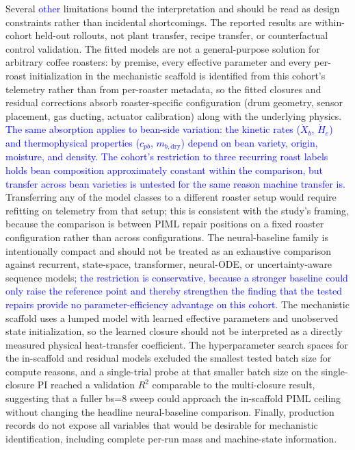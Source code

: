 \documentclass[fleqn,10pt]{wlscirep}
\newcommand{\rev}[1]{\textcolor{blue}{#1}}
\begin{document}
Several \rev{other} limitations bound the interpretation and should be read as design constraints rather than incidental shortcomings. The reported results are within-cohort held-out rollouts, not plant transfer, recipe transfer, or counterfactual control validation. The fitted models are not a general-purpose solution for arbitrary coffee roasters: by premise, every effective parameter and every per-roast initialization in the mechanistic scaffold is identified from this cohort's telemetry rather than from per-roaster metadata, so the fitted closures and residual corrections absorb roaster-specific configuration (drum geometry, sensor placement, gas ducting, actuator calibration) along with the underlying physics. \rev{The same absorption applies to bean-side variation: the kinetic rates ($\dot{X}_b$, $\dot{H}_e$) and thermophysical properties ($c_{pb}$, $m_{b,\mathrm{dry}}$) depend on bean variety, origin, moisture, and density. The cohort's restriction to three recurring roast labels holds bean composition approximately constant within the comparison, but transfer across bean varieties is untested for the same reason machine transfer is.} Transferring any of the model classes to a different roaster setup would require refitting on telemetry from that setup; this is consistent with the study's framing, because the comparison is between PIML repair positions on a fixed roaster configuration rather than across configurations. The neural-baseline family is intentionally compact and should not be treated as an exhaustive comparison against recurrent, state-space, transformer, neural-ODE, or uncertainty-aware sequence models\rev{; the restriction is conservative, because a stronger baseline could only raise the reference point and thereby strengthen the finding that the tested repairs provide no parameter-efficiency advantage on this cohort}. The mechanistic scaffold uses a lumped model with learned effective parameters and unobserved state initialization, so the learned closure should not be interpreted as a directly measured physical heat-transfer coefficient. The hyperparameter search spaces for the in-scaffold and residual models excluded the smallest tested batch size for compute reasons, and a single-trial probe at that smaller batch size on the single-closure PI reached a validation $R^2$ comparable to the multi-closure result, suggesting that a fuller bs=8 sweep could approach the in-scaffold PIML ceiling without changing the headline neural-baseline comparison. Finally, production records do not expose all variables that would be desirable for mechanistic identification, including complete per-run mass and machine-state information.
\end{document}
